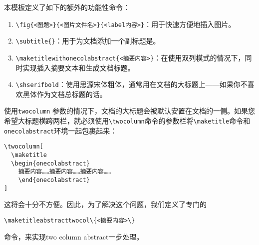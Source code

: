 本模板定义了如下的额外的功能性命令：

\begin{enumerate}
    \item \texttt{\textbackslash fig\{<图题>\}\{<图片文件名>\}\{<label内容>\}}：用于快速方便地插入图片。
    \item \texttt{\textbackslash subtitle\{\}}：用于为文档添加一个副标题是。
    \item \texttt{\textbackslash maketitlewithonecolabstract\{<摘要内容>\}}：在使用双列模式的情况下，同时实现插入摘要文本和生成文档标题。
    \item \texttt{\textbackslash shserifbold}：使用思源宋体粗体，通常用在文档的大标题上——如果你不喜欢黑体作为文档总标题的话。
\end{enumerate}

\begin{remark}
  使用\texttt{twocolumn} 参数的情况下，文档的大标题会被默认安置在文档的一侧。如果您希望大标题横跨两栏，就必须使用\texttt{\textbackslash twocolumn}命令的参数栏将\texttt{\textbackslash maketitle}命令和\texttt{onecolabstract}环境一起包裹起来：

\begin{verbatim}
\twocolumn[
  \maketitle
  \begin{onecolabstract}
    摘要内容……摘要内容……摘要内容……
    \end{onecolabstract}
]
\end{verbatim}

  这将会十分不方便。因此，为了解决这个问题，我们定义了专门的
\begin{verbatim}
\maketitleabstracttwocol\{<摘要内容>\}
\end{verbatim}
  命令，来实现two column abstract一步处理。
\end{remark}